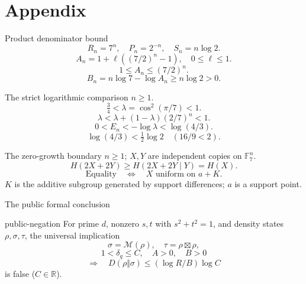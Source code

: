 \documentclass{beamer}
\begin{document}
\section{Appendix}
\begin{frame}{Product denominator bound}
\[R_n=7^n,\quad P_n=2^{-n},\quad S_n=n\log2.\]
\[A_n=1+\ell((7/2)^n-1),\quad 0\le\ell\le1.\]
\[1\le A_n\le(7/2)^n.\]
\[B_n=n\log7-\log A_n\ge n\log2>0.\]
\end{frame}
\begin{frame}{The strict logarithmic comparison}
$n\ge1$.
\[\tfrac34\mathrel{<}\lambda=\cos^2(\pi/7)\mathrel{<}1.\]
\[\lambda\mathrel{<}\lambda+(1-\lambda)(2/7)^n\mathrel{<}1.\]
\[0\mathrel{<}E_n\mathrel{<}-\log\lambda\mathrel{<}\log(4/3).\]
\[\log(4/3)\mathrel{<}\tfrac12\log2\quad(16/9\mathrel{<}2).\]
\end{frame}
\begin{frame}{The zero-growth boundary}
$n\ge1$; $X,Y$ are independent copies on $\mathbb F_7^n$.
\[H(2X+2Y)\ge H(2X+2Y\mid Y)=H(X).\]
\[\text{Equality}\quad\Longleftrightarrow\quad X\text{ uniform on }a+K.\]
$K$ is the additive subgroup generated by support differences; $a$ is a support point.

\end{frame}
\begin{frame}{The public formal conclusion}
\begin{bookresult}{public-negation}
For prime $d$, nonzero $s,t$ with $s^2+t^2=1$, and density states $\rho,\sigma,\tau$, the universal implication
\[\sigma=\mathcal M(\rho),\quad\tau=\rho\boxtimes\rho,\]
\[1\mathrel{<}\delta_q\le C,\quad A>0,\quad B>0\]
\[\Longrightarrow\quad D(\rho\Vert\sigma)\le(\log R/B)\log C\]
is false ($C\in\mathbb R$).
\end{bookresult}
\end{frame}
\end{document}
